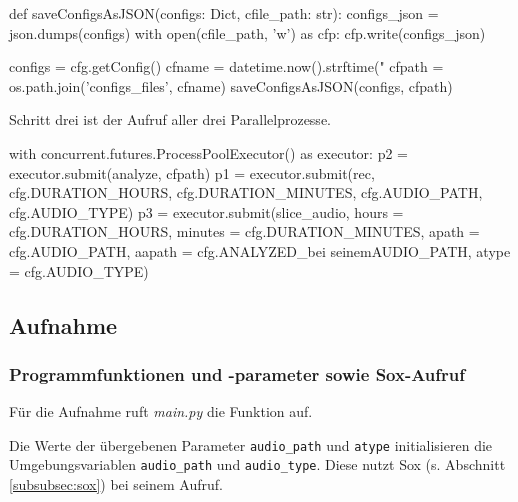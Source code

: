 \begin{python}
    def saveConfigsAsJSON(configs: Dict, cfile_path: str):
        configs_json = json.dumps(configs)
        with open(cfile_path, 'w') as cfp: 
            cfp.write(configs_json)
            
    configs = cfg.getConfig()
    cfname = datetime.now().strftime("%
    cfpath = os.path.join('configs_files', cfname)
    saveConfigsAsJSON(configs, cfpath)

\end{python}

Schritt drei ist der Aufruf aller drei Parallelprozesse.


\begin{python}
      with concurrent.futures.ProcessPoolExecutor() as executor:
        p2 = executor.submit(analyze, cfpath)
        p1 = executor.submit(rec, cfg.DURATION_HOURS, cfg.DURATION_MINUTES, cfg.AUDIO_PATH, cfg.AUDIO_TYPE)
        p3 = executor.submit(slice_audio, hours = cfg.DURATION_HOURS, minutes = cfg.DURATION_MINUTES, apath = cfg.AUDIO_PATH, aapath = cfg.ANALYZED_bei seinemAUDIO_PATH, atype = cfg.AUDIO_TYPE)
\end{python}


\subsection{Aufnahme}

\subsubsection{Programmfunktionen und -parameter sowie Sox-Aufruf}
Für die Aufnahme ruft \textit{main.py} die Funktion  auf. 


Die Werte der übergebenen Parameter \texttt{audio\_path} und \texttt{atype} initialisieren die Umgebungsvariablen  \texttt{audio\_path} und \texttt{audio\_type}. Diese nutzt Sox (s. Abschnitt \ref{subsubsec:sox}) bei seinem Aufruf. 


